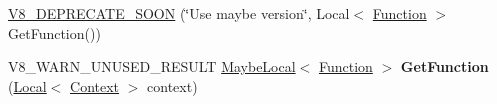\begin{DoxyCompactItemize}
\item 
\hyperlink{classv8_1_1_function_template_a007fd05a3fa3c960bf7ddbc05c724d2b}{V8\+\_\+\+D\+E\+P\+R\+E\+C\+A\+T\+E\+\_\+\+S\+O\+ON} (\char`\"{}Use maybe version\char`\"{}, Local$<$ \hyperlink{classv8_1_1_function}{Function} $>$ Get\+Function())
\item 
V8\+\_\+\+W\+A\+R\+N\+\_\+\+U\+N\+U\+S\+E\+D\+\_\+\+R\+E\+S\+U\+LT \hyperlink{classv8_1_1_maybe_local}{Maybe\+Local}$<$ \hyperlink{classv8_1_1_function}{Function} $>$ {\bfseries Get\+Function} (\hyperlink{classv8_1_1_local}{Local}$<$ \hyperlink{classv8_1_1_context}{Context} $>$ context)\hypertarget{classv8_1_1_function_template_a77aa424e4ed297452be0412930340262}{}\label{classv8_1_1_function_template_a77aa424e4ed297452be0412930340262}


\end{DoxyCompactItemize}
